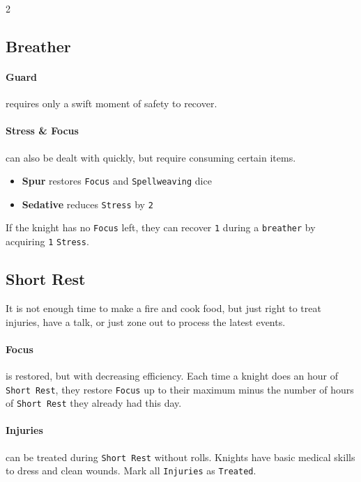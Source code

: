\documentclass{osr-template/zine}
\begin{document}
\begin{multicols*}{2}

\subsection*{Breather}

\paragraph{Guard} requires only a swift moment of safety to recover.

\paragraph{Stress \& Focus} can also be dealt with quickly, but require consuming certain items.

\begin{itemize}[nosep]
    \item[\ding{60}] \textbf{Spur} restores \texttt{Focus} and \texttt{Spellweaving} dice
    \item[\ding{60}] \textbf{Sedative} reduces \texttt{Stress} by \texttt{2}
\end{itemize}

If the knight has no \texttt{Focus} left, they can recover \texttt{1} during a \texttt{breather} by acquiring \texttt{1} \texttt{Stress}.

\subsection*{Short Rest}

It is not enough time to make a fire and cook food, but just right to treat injuries, have a talk, or just zone out to process the latest events.

\paragraph{Focus} is restored, but with decreasing efficiency.
Each time a knight does an hour of \texttt{Short Rest}, they restore \texttt{Focus} up to their maximum minus the number of hours of \texttt{Short Rest} they already had this day.

\paragraph{Injuries} can be treated during \texttt{Short Rest} without rolls. Knights have basic medical skills to dress and clean wounds. Mark all \texttt{Injuries} as \texttt{Treated}.



\end{multicols*}
\end{document}
